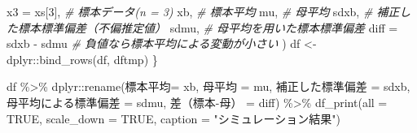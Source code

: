 \documentclass[]{tufte-handout}
\newenvironment{Shaded}{}{}
\newcommand{\AttributeTok}[1]{\textcolor[rgb]{0.49,0.56,0.16}{#1}}
\newcommand{\CommentTok}[1]{\textcolor[rgb]{0.38,0.63,0.69}{\textit{#1}}}
\newcommand{\ConstantTok}[1]{\textcolor[rgb]{0.53,0.00,0.00}{#1}}
\newcommand{\DecValTok}[1]{\textcolor[rgb]{0.25,0.63,0.44}{#1}}
\newcommand{\FunctionTok}[1]{\textcolor[rgb]{0.02,0.16,0.49}{#1}}
\newcommand{\NormalTok}[1]{#1}
\newcommand{\OtherTok}[1]{\textcolor[rgb]{0.00,0.44,0.13}{#1}}
\newcommand{\SpecialCharTok}[1]{\textcolor[rgb]{0.25,0.44,0.63}{#1}}
\newcommand{\StringTok}[1]{\textcolor[rgb]{0.25,0.44,0.63}{#1}}
\begin{document}
\begin{Shaded}
\begin{Highlighting}[numbers=left,,]
                      \AttributeTok{x3 =}\NormalTok{ xs[}\DecValTok{3}\NormalTok{],         }\CommentTok{\# 標本データ(n = 3)}
\NormalTok{                      xb,                 }\CommentTok{\# 標本平均}
\NormalTok{                      mu,                 }\CommentTok{\# 母平均}
\NormalTok{                      sdxb,               }\CommentTok{\# 補正した標本標準偏差（不偏推定値）}
\NormalTok{                      sdmu,               }\CommentTok{\# 母平均を用いた標本標準偏差}
                      \AttributeTok{diff =}\NormalTok{ sdxb }\SpecialCharTok{{-}}\NormalTok{ sdmu  }\CommentTok{\# 負値なら標本平均による変動が小さい}
\NormalTok{                      )}
\NormalTok{  df }\OtherTok{\textless{}{-}}\NormalTok{ dplyr}\SpecialCharTok{::}\FunctionTok{bind\_rows}\NormalTok{(df, dftmp)}
\NormalTok{\}}

\NormalTok{df }\SpecialCharTok{\%\textgreater{}\%} 
\NormalTok{  dplyr}\SpecialCharTok{::}\FunctionTok{rename}\NormalTok{(}\StringTok{\textasciigrave{}}\AttributeTok{標本平均}\StringTok{\textasciigrave{}}\OtherTok{=}\NormalTok{ xb, }\StringTok{\textasciigrave{}}\AttributeTok{母平均}\StringTok{\textasciigrave{}} \OtherTok{=}\NormalTok{ mu,}
                \StringTok{\textasciigrave{}}\AttributeTok{補正した標準偏差}\StringTok{\textasciigrave{}} \OtherTok{=}\NormalTok{ sdxb, }\StringTok{\textasciigrave{}}\AttributeTok{母平均による標準偏差}\StringTok{\textasciigrave{}} \OtherTok{=}\NormalTok{ sdmu,}
                \StringTok{\textasciigrave{}}\AttributeTok{差（標本{-}母）}\StringTok{\textasciigrave{}} \OtherTok{=}\NormalTok{ diff) }\SpecialCharTok{\%\textgreater{}\%} 
  \FunctionTok{df\_print}\NormalTok{(}\AttributeTok{all =} \ConstantTok{TRUE}\NormalTok{, }\AttributeTok{scale\_down =} \ConstantTok{TRUE}\NormalTok{, }\AttributeTok{caption =} \StringTok{"シミュレーション結果"}\NormalTok{)}
\end{Highlighting}
\end{Shaded}
\end{document}

